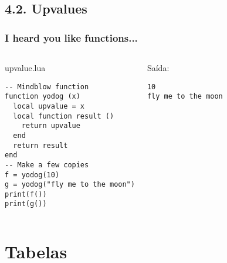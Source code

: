 \documentclass[brazil]{beamer}
\begin{document}
\subsection{4.2. Upvalues}
\begin{frame}[fragile]
  \frametitle{I heard you like functions...}
  \pause
  \begin{columns}
      \begin{block}{upvalue.lua}
        \begin{lstlisting}
-- Mindblow function
function yodog (x)
  local upvalue = x
  local function result ()
    return upvalue
  end
  return result
end
-- Make a few copies
f = yodog(10)
g = yodog("fly me to the moon")
print(f())
print(g())
        \end{lstlisting}
      \end{block}
    \pause
      \begin{block}{Saída:}
        \begin{verbatim}
10
fly me to the moon \end{verbatim}
      \end{block}
  \end{columns}
\end{frame}
\section{Tabelas}
\end{document}
